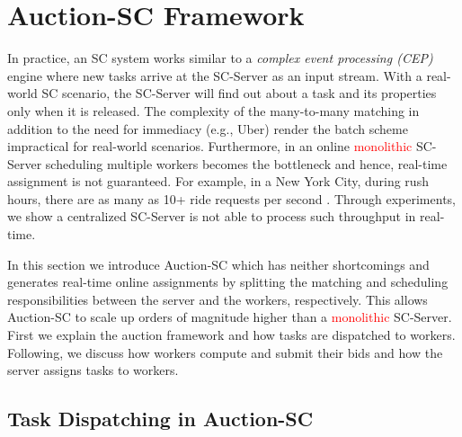 \section{Auction-SC Framework}
\label{sec:onlinealgo}

In practice, an SC system works similar to a \emph{complex event processing (CEP)} engine \cite{Luckham01} where new tasks arrive at the SC-Server as an input stream. With a real-world SC scenario, the SC-Server will find out about a task and its properties only when it is released. The complexity of the many-to-many matching in addition to the need for immediacy (e.g., Uber) render the batch scheme impractical for real-world scenarios. Furthermore, in an online \textcolor{red}{monolithic} SC-Server scheduling multiple workers becomes the bottleneck and hence, real-time assignment is not guaranteed. For example, in a New York City, during rush hours, there are as many as 10+ ride requests per second \cite{NYCTaxi}. Through experiments, we show a centralized SC-Server is not able to process such throughput in real-time.

In this section we introduce Auction-SC which has neither shortcomings and generates real-time online assignments by splitting the matching and scheduling responsibilities between the server and the workers, respectively. This allows Auction-SC to scale up orders of magnitude higher than a \textcolor{red}{monolithic} SC-Server. First we explain the auction framework and how tasks are dispatched to workers. Following, we discuss how workers compute and submit their bids and how the server assigns tasks to workers.

\subsection{Task Dispatching in Auction-SC}


